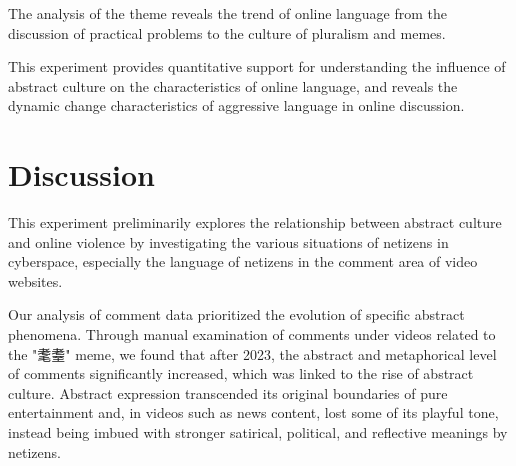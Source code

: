 \documentclass[12pt,a4paper]{ctexart}
\begin{document}
The analysis of the theme reveals the trend of online language from the discussion of practical problems to the culture of pluralism and memes.

This experiment provides quantitative support for understanding the influence of abstract culture on the characteristics of online language, and reveals the dynamic change characteristics of aggressive language in online discussion.
\newpage

\section{Discussion}

This experiment preliminarily explores the relationship between abstract culture and online violence by investigating the various situations of netizens in cyberspace, especially the language of netizens in the comment area of video websites.


Our analysis of comment data prioritized the evolution of specific abstract phenomena. Through manual examination of comments under videos related to the "耄耋" meme, we found that after 2023, the abstract and metaphorical level of comments significantly increased, which was linked to the rise of abstract culture. Abstract expression transcended its original boundaries of pure entertainment and, in videos such as news content, lost some of its playful tone, instead being imbued with stronger satirical, political, and reflective meanings by netizens.
\end{document}
